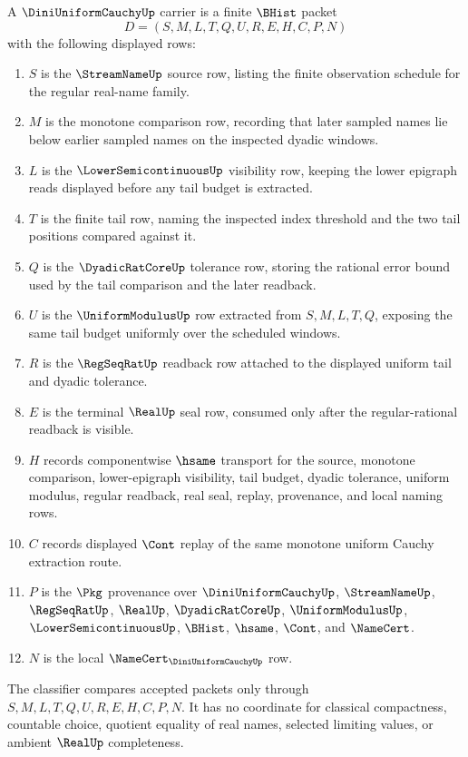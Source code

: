 \begin{definition}
\label{def:dini-uniform-cauchy-carrier}
A $\DiniUniformCauchyUp$ carrier is a finite $\BHist$ packet
$$
D=(S,M,L,T,Q,U,R,E,H,C,P,N)
$$
with the following displayed rows:
\begin{enumerate}
\item $S$ is the $\StreamNameUp$ source row, listing the finite observation schedule for the regular real-name family.
\item $M$ is the monotone comparison row, recording that later sampled names lie below earlier sampled names on the inspected dyadic windows.
\item $L$ is the $\LowerSemicontinuousUp$ visibility row, keeping the lower epigraph reads displayed before any tail budget is extracted.
\item $T$ is the finite tail row, naming the inspected index threshold and the two tail positions compared against it.
\item $Q$ is the $\DyadicRatCoreUp$ tolerance row, storing the rational error bound used by the tail comparison and the later readback.
\item $U$ is the $\UniformModulusUp$ row extracted from $S,M,L,T,Q$, exposing the same tail budget uniformly over the scheduled windows.
\item $R$ is the $\RegSeqRatUp$ readback row attached to the displayed uniform tail and dyadic tolerance.
\item $E$ is the terminal $\RealUp$ seal row, consumed only after the regular-rational readback is visible.
\item $H$ records componentwise $\hsame$ transport for the source, monotone comparison, lower-epigraph visibility, tail budget, dyadic tolerance, uniform modulus, regular readback, real seal, replay, provenance, and local naming rows.
\item $C$ records displayed $\Cont$ replay of the same monotone uniform Cauchy extraction route.
\item $P$ is the $\Pkg$ provenance over $\DiniUniformCauchyUp$, $\StreamNameUp$, $\RegSeqRatUp$, $\RealUp$, $\DyadicRatCoreUp$, $\UniformModulusUp$, $\LowerSemicontinuousUp$, $\BHist$, $\hsame$, $\Cont$, and $\NameCert$.
\item $N$ is the local $\NameCert_{\DiniUniformCauchyUp}$ row.
\end{enumerate}
The classifier compares accepted packets only through $S,M,L,T,Q,U,R,E,H,C,P,N$. It has no coordinate for classical compactness, countable choice, quotient equality of real names, selected limiting values, or ambient $\RealUp$ completeness.
\end{definition}

